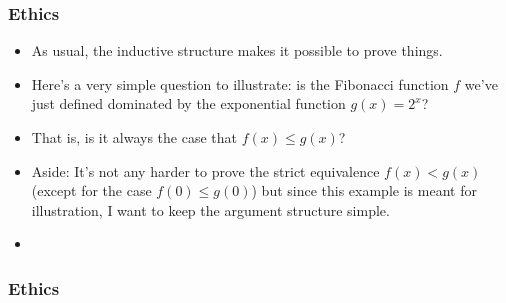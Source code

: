 \begin{frame}
\frametitle{Ethics}

\begin{itemize}[<+->]
\item 
\noindent As usual, the inductive structure makes it possible to prove things.

\item Here's a very simple question to illustrate: is the Fibonacci function $f$ we've just defined dominated by the exponential function $g(x) = 2^x$?

\item That is, is it always the case that  $f(x) \leq g(x)$?

\item Aside: It's not any harder to prove the strict equivalence $f(x) < g(x)$ (except for the case $f(0) \leq g(0)$) but since this example is meant for illustration, I want to keep the argument structure simple.  

\item 
\end{itemize} 
\end{frame}


\begin{frame}
\frametitle{Ethics}

\end{frame}



